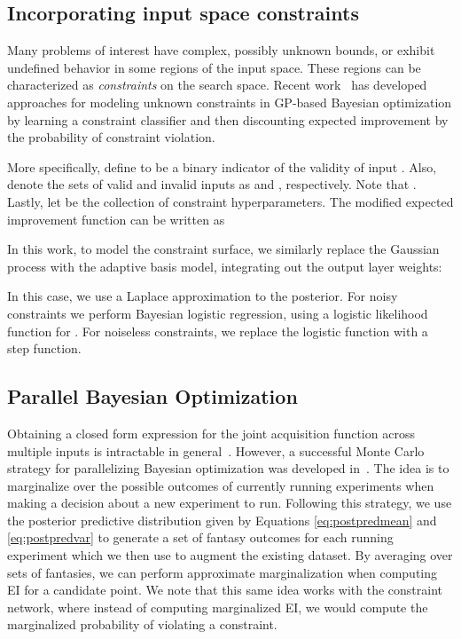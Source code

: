 \documentclass{article}
\begin{document}
\subsection{Incorporating input space constraints}
Many problems of interest have complex, possibly unknown bounds, or exhibit undefined behavior in some regions of the input space.  These regions can be characterized as \emph{constraints} on the search space.  Recent work~\cite{gelbart-etal-2014,snoek-2013a,gramacy2010} has developed approaches for modeling unknown constraints in GP-based Bayesian optimization by learning a constraint classifier and then discounting expected improvement by the probability of constraint violation.

More specifically, define  to be a binary indicator of the validity of input . Also, denote the sets of valid and invalid inputs as  and , respectively. Note that . Lastly, let  be the collection of constraint hyperparameters. The modified expected improvement function can be written as


In this work, to model the constraint surface, we similarly replace the Gaussian process with the adaptive basis model, integrating out the output layer weights:


In this case, we use a Laplace approximation to the posterior.  For noisy constraints we perform Bayesian logistic regression, using a logistic likelihood function for .  For noiseless constraints, we replace the logistic function with a step function.

\subsection{Parallel Bayesian Optimization}
Obtaining a closed form expression for the joint acquisition function across multiple inputs is intractable in general~\cite{Ginsbourger2010a}.  However, a successful Monte Carlo strategy for parallelizing Bayesian optimization was developed in~\citet{snoek-etal-2012b}. The idea is to marginalize over the possible outcomes of currently running experiments when making a decision about a new experiment to run. Following this strategy, we use the posterior predictive distribution given by Equations \ref{eq:postpredmean} and \ref{eq:postpredvar} to generate a set of fantasy outcomes for each running experiment which we then use to augment the existing dataset. By averaging over sets of fantasies, we can perform approximate marginalization when computing EI for a candidate point. We note that this same idea works with the constraint network, where instead of computing marginalized EI, we would compute the marginalized probability of violating a constraint.
\end{document}
